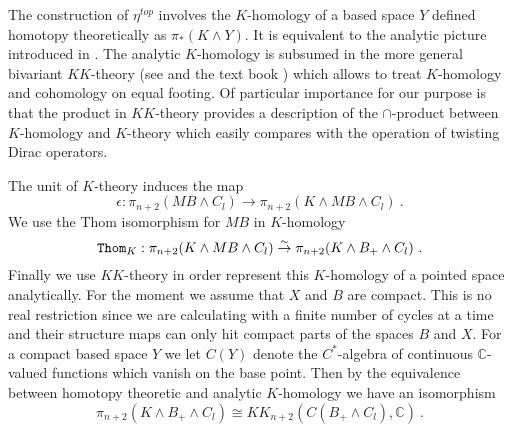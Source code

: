 \documentclass[12pt]{article}
\newcommand{\Thom}{{\tt Thom}}
\newcommand{\C}{{\mathbb{C}}}
\begin{document}
%


The construction of $\eta^{top}$ involves the $K$-homology of a based space $Y$ defined homotopy theoretically as $\pi_{*}(K\wedge Y)$. It is equivalent to the analytic picture introduced in \cite{MR679698}. The analytic $K$-homology is subsumed in the more general bivariant $KK$-theory (see \cite{MR918241} and the text book \cite{MR1656031}) which allows to treat $K$-homology and cohomology on equal footing.
Of particular importance for our purpose is that the product in $KK$-theory provides a description of the $\cap$-product
between $K$-homology and $K$-theory which easily compares with the operation of twisting Dirac operators.

 




The unit of $K$-theory induces the map
\begin{equation}\label{eq20}\epsilon:\pi_{n+2}(MB\wedge C_{l})\to \pi_{n+2}(K\wedge MB\wedge C_{l})\ .\end{equation}
We use the Thom isomorphism for $MB$ in $K$-homology 
\begin{equation}\label{eq21}\Thom_{K}:\pi_{n+2}(K\wedge MB\wedge C_{l})\stackrel{\sim}{\to} \pi_{n+2}(K\wedge B_{+}\wedge C_{l})\ .\end{equation}
Finally we use $KK$-theory in order represent this  $K$-homology  of a pointed space analytically.
For the moment we assume that $X$ and $B$ are compact. This is no real restriction since we are calculating with a finite number of cycles at a time and their structure maps can only hit compact parts
of the spaces $B$ and $X$. For a compact based space $Y$ we let $C(Y)$ denote the $C^{*}$-algebra
of continuous $\C$-valued functions which vanish on the base point.
Then by the equivalence between homotopy theoretic and analytic $K$-homology \cite{MR679698} we have an isomorphism
 \begin{equation}\label{eq22}\pi_{n+2}(K\wedge B_{+}\wedge C_{l})\cong KK_{n+2}(C(B_{+}\wedge C_{l}),\C)\ . \end{equation}
 
 
 
\end{document}
